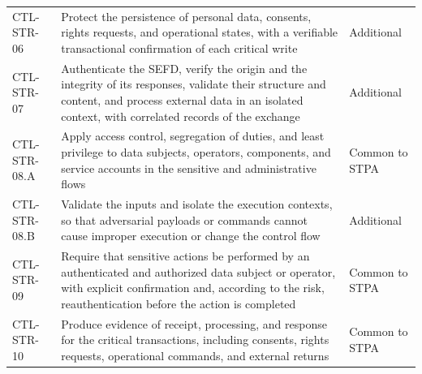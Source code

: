 \begin{longtable}{l p{} p{}}
        CTL-STR-06 & Protect the persistence of personal data, consents, rights requests, and operational states, with a verifiable transactional confirmation of each critical write & Additional \\[0.4em]
        CTL-STR-07 & Authenticate the SEFD, verify the origin and the integrity of its responses, validate their structure and content, and process external data in an isolated context, with correlated records of the exchange & Additional \\[0.4em]
        CTL-STR-08.A & Apply access control, segregation of duties, and least privilege to data subjects, operators, components, and service accounts in the sensitive and administrative flows & Common to STPA \\[0.4em]
        CTL-STR-08.B & Validate the inputs and isolate the execution contexts, so that adversarial payloads or commands cannot cause improper execution or change the control flow & Additional \\[0.4em]
        CTL-STR-09 & Require that sensitive actions be performed by an authenticated and authorized data subject or operator, with explicit confirmation and, according to the risk, reauthentication before the action is completed & Common to STPA \\[0.4em]
        CTL-STR-10 & Produce evidence of receipt, processing, and response for the critical transactions, including consents, rights requests, operational commands, and external returns & Common to STPA \\
\end{longtable}

